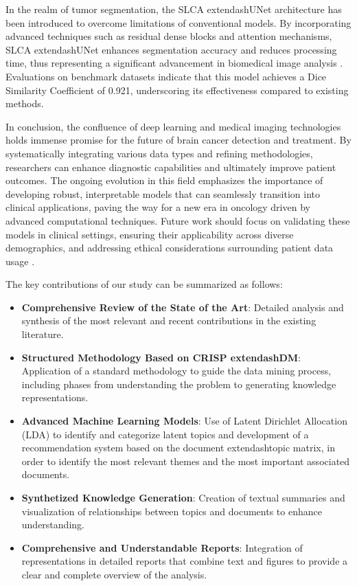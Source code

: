 \documentclass[runningheads]{llncs}
\begin{document}
In the realm of tumor segmentation, the SLCA	extendash{}UNet architecture has been introduced to overcome limitations of conventional models. By incorporating advanced techniques such as residual dense blocks and attention mechanisms, SLCA	extendash{}UNet enhances segmentation accuracy and reduces processing time, thus representing a significant advancement in biomedical image analysis \cite{P.S._2025}. Evaluations on benchmark datasets indicate that this model achieves a Dice Similarity Coefficient of 0.921, underscoring its effectiveness compared to existing methods.

In conclusion, the confluence of deep learning and medical imaging technologies holds immense promise for the future of brain cancer detection and treatment. By systematically integrating various data types and refining methodologies, researchers can enhance diagnostic capabilities and ultimately improve patient outcomes. The ongoing evolution in this field emphasizes the importance of developing robust, interpretable models that can seamlessly transition into clinical applications, paving the way for a new era in oncology driven by advanced computational techniques. Future work should focus on validating these models in clinical settings, ensuring their applicability across diverse demographics, and addressing ethical considerations surrounding patient data usage \cite{Hossain_2024}.

The key contributions of our study can be summarized as follows: 

\begin{itemize}
    \item \textbf{Comprehensive Review of the State of the Art}: Detailed analysis and synthesis of the most relevant and recent contributions in the existing literature.
    \item \textbf{Structured Methodology Based on CRISP	extendash{}DM}: Application of a standard methodology to guide the data mining process, including phases from understanding the problem to generating knowledge representations.
    \item \textbf{Advanced Machine Learning Models}: Use of Latent Dirichlet Allocation (LDA) to identify and categorize latent topics and development of a recommendation system based on the document	extendash{}topic matrix, in order to identify the most relevant themes and the most important associated documents.
    \item \textbf{Synthetized Knowledge Generation}: Creation of textual summaries and visualization of relationships between topics and documents to enhance understanding.
    \item \textbf{Comprehensive and Understandable Reports}: Integration of representations in detailed reports that combine text and figures to provide a clear and complete overview of the analysis.
\end{itemize}
\end{document}
